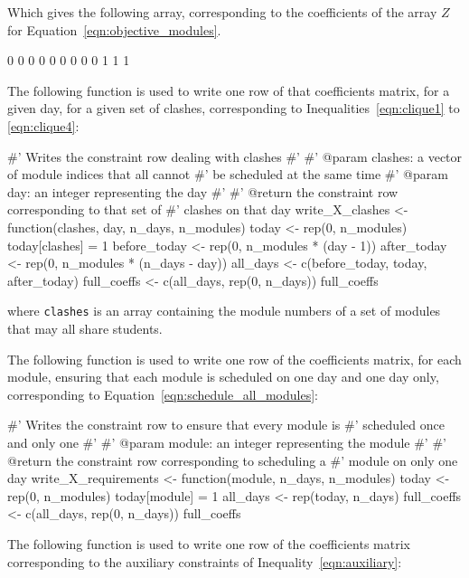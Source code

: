 Which gives the following array, corresponding to the coefficients of the
array \(Z\) for Equation~\ref{eqn:objective_modules}.

\begin{Rout-no-test}
[1] 0 0 0 0 0 0 0 0 0 1 1 1
\end{Rout-no-test}

The following function is used to write one row of that coefficients matrix, for
a given day, for a given set of clashes, corresponding to
Inequalities~\ref{eqn:clique1} to \ref{eqn:clique4}:

\begin{Rin-no-test}
#' Writes the constraint row dealing with clashes
#'
#' @param clashes: a vector of module indices that all cannot
#'                 be scheduled at the same time
#' @param day: an integer representing the day
#'
#' @return the constraint row corresponding to that set of
#'         clashes on that day
write_X_clashes <- function(clashes, day, n_days, n_modules){
  today <- rep(0, n_modules)
  today[clashes] = 1
  before_today <- rep(0, n_modules * (day - 1))
  after_today <- rep(0, n_modules * (n_days - day))
  all_days <- c(before_today, today, after_today)
  full_coeffs <- c(all_days, rep(0, n_days))
  full_coeffs
}
\end{Rin-no-test}

where \texttt{clashes} is an array containing the module numbers of a set
of modules that may all share students.

The following function is used to write one row of the coefficients matrix, for
each module, ensuring that each module is scheduled on one day and one day only,
corresponding to Equation~\ref{eqn:schedule_all_modules}:

\begin{Rin-no-test}
#' Writes the constraint row to ensure that every module is
#' scheduled once and only one
#'
#' @param module: an integer representing the module
#'
#' @return the constraint row corresponding to scheduling a
#'         module on only one day
write_X_requirements <- function(module, n_days, n_modules){
  today <- rep(0, n_modules)
  today[module] = 1
  all_days <- rep(today, n_days)
  full_coeffs <- c(all_days, rep(0, n_days))
  full_coeffs
}
\end{Rin-no-test}

The following function is used to write one row of the coefficients matrix
corresponding to the auxiliary constraints of Inequality~\ref{eqn:auxiliary}:

